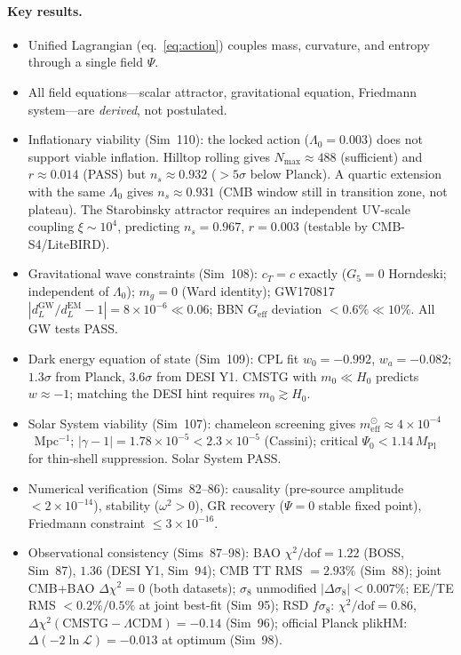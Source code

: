 \documentclass[12pt,a4paper]{article}
\begin{document}
\paragraph{Key results.}
\begin{itemize}
  \item Unified Lagrangian (eq.~\eqref{eq:action}) couples mass, curvature, and entropy through a single field $\Psi$.
  \item All field equations---scalar attractor, gravitational equation, Friedmann system---are \emph{derived}, not postulated.
  \item Inflationary viability (Sim~110): the locked action ($\Lambda_0=0.003$) does not support viable inflation.  Hilltop rolling gives $N_\mathrm{max}\approx488$ (sufficient) and $r\approx0.014$ (PASS) but $n_s\approx0.932$ ($>5\sigma$ below Planck).  A quartic extension with the same $\Lambda_0$ gives $n_s\approx0.931$ (CMB window still in transition zone, not plateau).  The Starobinsky attractor requires an independent UV-scale coupling $\xi\sim10^4$, predicting $n_s=0.967$, $r=0.003$ (testable by CMB-S4/LiteBIRD).
  \item Gravitational wave constraints (Sim~108): $c_T=c$ exactly ($G_5=0$ Horndeski; independent of $\Lambda_0$); $m_g=0$ (Ward identity); GW170817 $|d_L^\mathrm{GW}/d_L^\mathrm{EM}-1|=8\times10^{-6}\ll0.06$; BBN $G_\mathrm{eff}$ deviation $<0.6\%\ll10\%$.  All GW tests PASS.
  \item Dark energy equation of state (Sim~109): CPL fit $w_0=-0.992$, $w_a=-0.082$; $1.3\sigma$ from Planck, $3.6\sigma$ from DESI Y1.  CMSTG with $m_0\ll H_0$ predicts $w\approx-1$; matching the DESI hint requires $m_0\gtrsim H_0$.
  \item Solar System viability (Sim~107): chameleon screening gives $m_\mathrm{eff}^\odot\approx4\times10^{-4}$~Mpc$^{-1}$; $|\gamma-1|=1.78\times10^{-5}<2.3\times10^{-5}$ (Cassini); critical $\Psi_0<1.14\,M_\mathrm{Pl}$ for thin-shell suppression.  Solar System PASS.
  \item Numerical verification (Sims~82--86): causality (pre-source amplitude $< 2\times 10^{-14}$), stability ($\omega^2 > 0$), GR recovery ($\Psi = 0$ stable fixed point), Friedmann constraint $\leq 3 \times 10^{-16}$.
  \item Observational consistency (Sims~87--98): BAO $\chi^2/\mathrm{dof} = 1.22$ (BOSS, Sim~87), $1.36$ (DESI Y1, Sim~94); CMB TT RMS $= 2.93\%$ (Sim~88); joint CMB+BAO $\Delta\chi^2 = 0$ (both datasets); $\sigma_8$ unmodified $|\Delta\sigma_8| < 0.007\%$; EE/TE RMS $< 0.2\%/0.5\%$ at joint best-fit (Sim~95); RSD $f\sigma_8$: $\chi^2/\mathrm{dof}=0.86$, $\Delta\chi^2(\mathrm{CMSTG}-\Lambda\mathrm{CDM})=-0.14$ (Sim~96); official Planck plikHM: $\Delta(-2\ln\mathcal{L})=-0.013$ at optimum (Sim~98).

\end{itemize}
\end{document}
